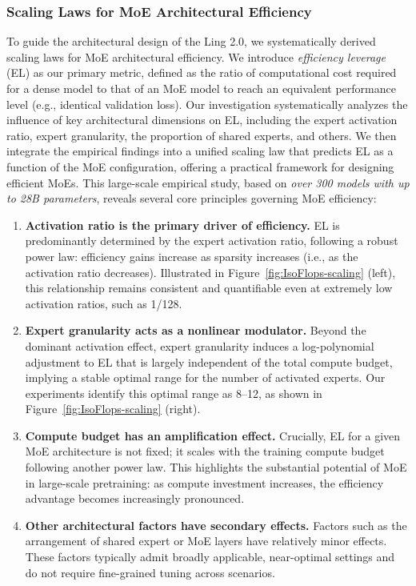 \documentclass[table]{gtech}
\theoremstyle{definition}
\begin{document}
\subsubsection{Scaling Laws for MoE Architectural Efficiency}
\label{sec:scaling4moe}
To guide the architectural design of the Ling 2.0, we systematically derived scaling laws for MoE architectural efficiency. We introduce \textit{efficiency leverage} (EL) as our primary metric, defined as the ratio of computational cost required for a dense model to that of an MoE model to reach an equivalent performance level (e.g., identical validation loss). Our investigation systematically analyzes the influence of key architectural dimensions on EL, including the expert activation ratio, expert granularity, the proportion of shared experts, and others. We then integrate the empirical findings into a unified scaling law that predicts EL as a function of the MoE configuration, offering a practical framework for designing efficient MoEs. This large-scale empirical study, based on \textit{over 300 models with up to 28B parameters}, reveals several core principles governing MoE efficiency:

\begin{enumerate}
\item \textbf{Activation ratio is the primary driver of efficiency.}
EL is predominantly determined by the expert activation ratio, following a robust power law: efficiency gains increase as sparsity increases (i.e., as the activation ratio decreases). Illustrated in Figure~\ref{fig:IsoFlops-scaling} (left), this relationship remains consistent and quantifiable even at extremely low activation ratios, such as 1/128.

\item \textbf{Expert granularity acts as a nonlinear modulator.}
Beyond the dominant activation effect, expert granularity induces a log-polynomial adjustment to EL that is largely independent of the total compute budget, implying a stable optimal range for the number of activated experts. Our experiments identify this optimal range as 8--12, as shown in Figure~\ref{fig:IsoFlops-scaling} (right).

\item \textbf{Compute budget has an amplification effect.}
Crucially, EL for a given MoE architecture is not fixed; it scales with the training compute budget following another power law. This highlights the substantial potential of MoE in large-scale pretraining: as compute investment increases, the efficiency advantage becomes increasingly pronounced. 

\item \textbf{Other architectural factors have secondary effects.}
Factors such as the arrangement of shared expert or MoE layers have relatively minor effects. These factors typically admit broadly applicable, near-optimal settings and do not require fine-grained tuning across scenarios.

\end{enumerate}
\end{document}
